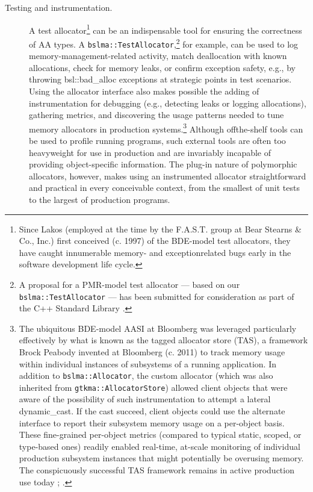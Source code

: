 \begin{description}
\item[Testing and instrumentation.] A test allocator\footnote{Since Lakos (employed at the time by the F.A.S.T. group at Bear Stearns \& Co., Inc.) first conceived
(c. 1997) of the BDE-model test allocators, they have caught innumerable memory- and exceptionrelated bugs
early in the software development life cycle.} can be an indispensable tool for
ensuring the correctness of AA types. A \lstinline{bslma::TestAllocator},\footnote{A proposal for a PMR-model test allocator — based on our \lstinline{bslma::TestAllocator} — has been
submitted for consideration as part of the C++ Standard Library \cite{feher18}.} for example, can
be used to log memory-management-related activity, match deallocation with known
allocations, check for memory leaks, or confirm exception safety, e.g., by throwing
bsl::bad_alloc exceptions at strategic points in test scenarios. Using the allocator 
  interface also makes possible the adding of instrumentation for debugging (e.g.,
detecting leaks or logging allocations), gathering metrics, and discovering the usage
patterns needed to tune memory allocators in production
systems.\footnote{The ubiquitous BDE-model AASI at Bloomberg was leveraged particularly effectively by what is
known as the tagged allocator store (TAS), a framework Brock Peabody invented at Bloomberg (c.
2011) to track memory usage within individual instances of subsystems of a running application. In
addition to \lstinline{bslma::Allocator}, the custom allocator (which was also inherited from
\lstinline{gtkma::AllocatorStore}) allowed client objects that were aware of the possibility of such
instrumentation to attempt a lateral dynamic_cast. If the cast succeed, client objects could use the
alternate interface to report their subsystem memory usage on a per-object basis. These fine-grained
per-object metrics (compared to typical static, scoped, or type-based ones) readily enabled real-time,
at-scale monitoring of individual production subsystem instances that might potentially be overusing
memory. The conspicuously successful TAS framework remains in active production use today
\cite{halpern20a}; \cite{halpern20b}.} Although
offthe-shelf tools can be used to profile running programs, such external tools are
often too heavyweight for use in production and are invariably incapable of providing
object-specific information. The plug-in nature of polymorphic allocators, however,
makes using an instrumented allocator straightforward and practical in every
conceivable context, from the smallest of unit tests to the largest of production
programs.


\end{description}
